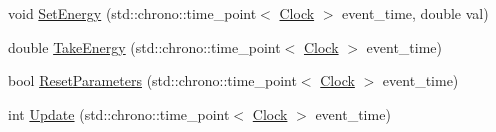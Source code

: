 \begin{DoxyCompactItemize}
void \mbox{\hyperlink{classCognitiveOutput_acc16ca3521689776ecd68255ece1e671}{Set\+Energy}} (std\+::chrono\+::time\+\_\+point$<$ \mbox{\hyperlink{universe_8h_a0ef8d951d1ca5ab3cfaf7ab4c7a6fd80}{Clock}} $>$ event\+\_\+time, double val)
\item 
double \mbox{\hyperlink{classCognitiveOutput_aae27d114676c68e02ae6e7ae36326ba8}{Take\+Energy}} (std\+::chrono\+::time\+\_\+point$<$ \mbox{\hyperlink{universe_8h_a0ef8d951d1ca5ab3cfaf7ab4c7a6fd80}{Clock}} $>$ event\+\_\+time)
\item 
bool \mbox{\hyperlink{classCognitiveOutput_ab43b79aaadf75d18512c4379a77542cd}{Reset\+Parameters}} (std\+::chrono\+::time\+\_\+point$<$ \mbox{\hyperlink{universe_8h_a0ef8d951d1ca5ab3cfaf7ab4c7a6fd80}{Clock}} $>$ event\+\_\+time)
\item 
int \mbox{\hyperlink{classCognitiveOutput_a2b4d33c7a529402c684d828efd25095a}{Update}} (std\+::chrono\+::time\+\_\+point$<$ \mbox{\hyperlink{universe_8h_a0ef8d951d1ca5ab3cfaf7ab4c7a6fd80}{Clock}} $>$ event\+\_\+time)
\end{DoxyCompactItemize}
